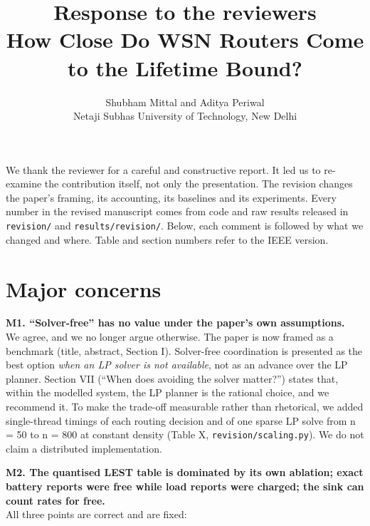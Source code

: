 \documentclass[11pt]{article}
\title{Response to the reviewers\\[4pt]\large How Close Do WSN Routers Come to the Lifetime Bound?}
\author{Shubham Mittal and Aditya Periwal\\Netaji Subhas University of Technology, New Delhi}
\date{}
\begin{document}
\maketitle
We thank the reviewer for a careful and constructive report. It led us to re-examine the contribution itself, not only the presentation. The revision changes the paper's framing, its accounting, its baselines and its experiments. Every number in the revised manuscript comes from code and raw results released in \texttt{revision/} and \texttt{results/revision/}. Below, each comment is followed by what we changed and where. Table and section numbers refer to the IEEE version.

\section*{Major concerns}
\medskip\noindent \textbf{M1. ``Solver-free'' has no value under the paper's own assumptions.}\\
We agree, and we no longer argue otherwise. The paper is now framed as a benchmark (title, abstract, Section I). Solver-free coordination is presented as the best option \emph{when an LP solver is not available}, not as an advance over the LP planner. Section VII (``When does avoiding the solver matter?'') states that, within the modelled system, the LP planner is the rational choice, and we recommend it. To make the trade-off measurable rather than rhetorical, we added single-thread timings of each routing decision and of one sparse LP solve from n = 50 to n = 800 at constant density (Table X, \texttt{revision/scaling.py}). We do not claim a distributed implementation.

\medskip\noindent \textbf{M2. The quantised LEST table is dominated by its own ablation; exact battery reports were free while load reports were charged; the sink can count rates for free.}\\
All three points are correct and are fixed:
\end{document}
